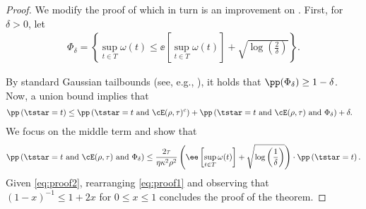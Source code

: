 \begin{proof}
    We modify the proof of \citet[Theorem 5]{block2024oracle} which in turn is an improvement on \citet{block2022smoothed}.  First, for $\delta > 0$, let
    \begin{align}
        \Phi_\delta = \left\{ \sup_{t \in T} \omega(t) \leq  \ee\left[ \sup_{t \in T} \omega(t) \right] + \sqrt{\log\left( \frac 2\delta \right)}\right\}.
    \end{align}

    
    By standard Gaussian tailbounds (see, e.g., \citet[Theorem 8.5.5]{vershynin2018high}), it holds that $\pp(\Phi_\delta) \geq 1 - \delta$.  Now, a union bound implies that
    \begin{align}\label{eq:proof1}
        \pp\left( \tstar = t \right) &\leq \pp\left( \tstar = t \text{ and } \cE(\rho, \tau)^c \right) + \pp\left( \tstar = t \text{ and } \cE(\rho, \tau) \text{ and } \Phi_\delta \right) + \delta.
    \end{align}
    We focus on the middle term and show that
    \begin{align}\label{eq:proof2}
        \pp\left( \tstar = t \text{ and } \cE(\rho, \tau) \text{ and } \Phi_\delta \right) \leq \frac{2\tau}{\eta \kappa^2 \rho^2} \left( \ee\left[ \sup_{t \in T} \omega(t) \right] + \sqrt{\log\left( \frac 1\delta \right)} \right) \cdot \pp\left( \tstar = t \right).
    \end{align}
    Given \eqref{eq:proof2}, rearranging \eqref{eq:proof1} and observing that $(1-x)^{-1} \leq 1 + 2x$ for $0 \leq x \leq 1$ concludes the proof of the theorem.


\end{proof}
